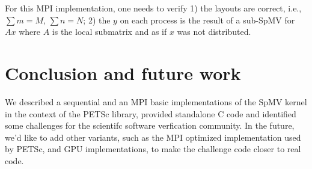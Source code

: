 \documentclass[submission]{eptcs}
\begin{document}
For this MPI implementation, one needs to verify 1) the layouts are correct, i.e., $\sum m = M$, $\sum n = N$;
2) the $y$ on each process is the result of a sub-SpMV for $Ax$ where $A$ is the local submatrix and
as if $x$ was not distributed.


\section{Conclusion and future work}
We described a sequential and an MPI basic implementations of the SpMV kernel
in the context of the PETSc library, provided standalone C code and identified
some challenges for the scientifc software verfication community.
In the future, we'd like to add other variants,
such as the MPI optimized implementation used by PETSc, and GPU implementations, to make the challenge code closer to real code.

\nocite{*}


\end{document}
